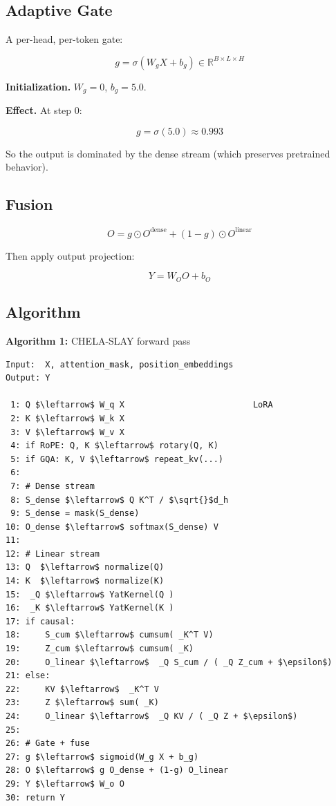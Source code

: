 \subsection{Adaptive Gate}

A per-head, per-token gate:

\[
g = \sigma(W_g X + b_g) \in \mathbb{R}^{B \times L \times H}
\]

\textbf{Initialization.} $W_g = 0$, $b_g = 5.0$.

\textbf{Effect.} At step 0:

\[
g = \sigma(5.0) \approx 0.993
\]

So the output is dominated by the dense stream (which preserves pretrained 
behavior).

\subsection{Fusion}

\[
O = g \odot O^\text{dense} + (1 - g) \odot O^\text{linear}
\]

Then apply output projection:

\[
Y = W_O O + b_O
\]

\subsection{Algorithm}

\textbf{Algorithm 1:} CHELA-SLAY forward pass
\begin{lstlisting}
Input:  X, attention_mask, position_embeddings
Output: Y

 1: Q $\leftarrow$ W_q X                          LoRA
 2: K $\leftarrow$ W_k X
 3: V $\leftarrow$ W_v X
 4: if RoPE: Q, K $\leftarrow$ rotary(Q, K)
 5: if GQA: K, V $\leftarrow$ repeat_kv(...)
 6:
 7: # Dense stream
 8: S_dense $\leftarrow$ Q K^T / $\sqrt{}$d_h
 9: S_dense = mask(S_dense)
10: O_dense $\leftarrow$ softmax(S_dense) V
11:
12: # Linear stream
13: Q  $\leftarrow$ normalize(Q)
14: K  $\leftarrow$ normalize(K)
15:  _Q $\leftarrow$ YatKernel(Q )
16:  _K $\leftarrow$ YatKernel(K )
17: if causal:
18:     S_cum $\leftarrow$ cumsum( _K^T V)
19:     Z_cum $\leftarrow$ cumsum( _K)
20:     O_linear $\leftarrow$  _Q S_cum / ( _Q Z_cum + $\epsilon$)
21: else:
22:     KV $\leftarrow$  _K^T V
23:     Z $\leftarrow$ sum( _K)
24:     O_linear $\leftarrow$  _Q KV / ( _Q Z + $\epsilon$)
25:
26: # Gate + fuse
27: g $\leftarrow$ sigmoid(W_g X + b_g)
28: O $\leftarrow$ g O_dense + (1-g) O_linear
29: Y $\leftarrow$ W_o O
30: return Y
\end{lstlisting}

